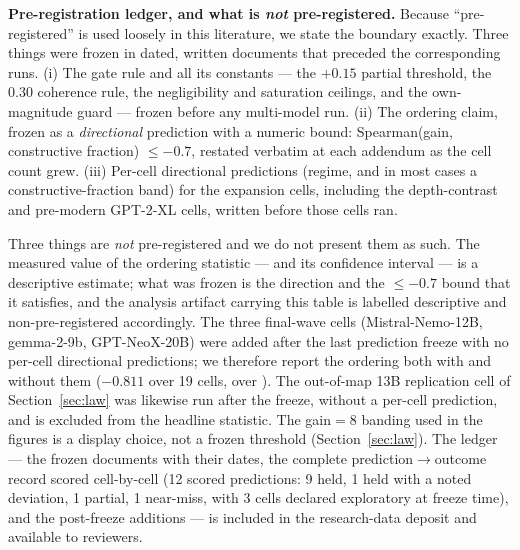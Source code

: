 \documentclass[preprint,12pt]{elsarticle}
\theoremstyle{definition}
\begin{document}
\textbf{Pre-registration ledger, and what is \emph{not} pre-registered.} Because
``pre-registered'' is used loosely in this literature, we state the boundary exactly.
Three things were frozen in dated, written documents that preceded the corresponding
runs. (i) The gate rule and all its constants --- the $+0.15$ partial threshold, the
$0.30$ coherence rule, the negligibility and saturation ceilings, and the own-magnitude
guard --- frozen before any multi-model run. (ii) The ordering claim, frozen as a
\emph{directional} prediction with a numeric bound: Spearman(gain, constructive
fraction) $\leq-0.7$, restated verbatim at each addendum as the cell count grew.
(iii) Per-cell directional predictions (regime, and in most cases a constructive-fraction
band) for the expansion cells, including the depth-contrast and pre-modern GPT-2-XL
cells, written before those cells ran.

Three things are \emph{not} pre-registered and we do not present them as such. The
measured value of the ordering statistic --- \ordSpearman{} and its confidence interval
--- is a descriptive estimate; what was frozen is the direction and the $\leq-0.7$ bound
that it satisfies, and the analysis artifact carrying this table is labelled descriptive
and non-pre-registered accordingly. The three final-wave cells (Mistral-Nemo-12B,
gemma-2-9b, GPT-NeoX-20B) were added after the last prediction freeze with no per-cell
directional predictions; we therefore report the ordering both with and without them
($-0.811$ over 19 cells, \ordSpearman{} over \nCells{}). The out-of-map 13B replication
cell of Section~\ref{sec:law} was likewise run after the freeze, without a per-cell
prediction, and is excluded from the headline statistic. The gain$=8$ banding used in
the figures is a display choice, not a frozen threshold (Section~\ref{sec:law}).
The ledger --- the frozen documents with their dates, the complete
prediction$\to$outcome record scored cell-by-cell (12 scored predictions: 9 held, 1 held
with a noted deviation, 1 partial, 1 near-miss, with 3 cells declared exploratory at
freeze time), and the post-freeze additions --- is included in the research-data deposit
and available to reviewers.
\end{document}
